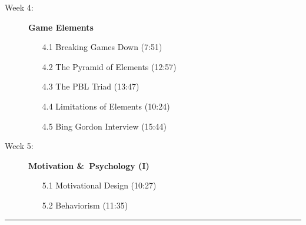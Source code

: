 \documentclass[a4paper]{article}
\begin{document}
{{\begin{description}
\item[Week 4:] \textbf{Game Elements}
\begin{itemize}
\item[4.1] Breaking Games Down (7:51)
\item[4.2] The Pyramid of Elements (12:57)
\item[4.3] The PBL Triad (13:47)
\item[4.4] Limitations of Elements (10:24)
\item[4.5] Bing Gordon Interview (15:44)
\end{itemize}
\item[Week 5:] \textbf{Motivation \&\ Psychology (I)}
\begin{itemize}
\item[5.1] Motivational Design (10:27)
\item[5.2] Behaviorism (11:35)
\end{itemize}
\end{description}}}

\hrule
\end{document}
